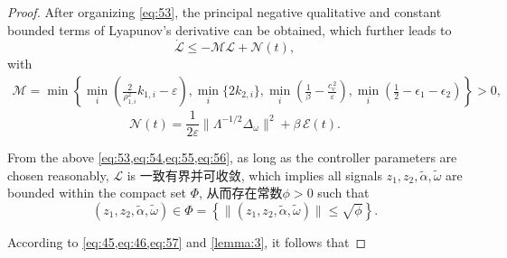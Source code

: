 \documentclass[pdflatex,sn-mathphys-num]{sn-jnl}%
\theoremstyle{thmstyleone}%
\theoremstyle{thmstyletwo}%
\theoremstyle{thmstylethree}%
\begin{document}
\begin{proof}
After organizing \cref{eq:53}, the principal negative qualitative and constant bounded terms of Lyapunov's derivative can be obtained, which further leads to
\begin{equation}\label{eq:54}
\dot{\mathcal{L}}\le -\mathcal{M}  \mathcal{L}+\mathcal{N}(t) ,
		\end{equation}
with
\begin{equation}\label{eq:55}
\begin{aligned}
\mathcal{M}  = \min \left\{
	\min_{i}\left(\frac{2}{\rho_{1,i}^2}k_{1,i}-\varepsilon\right), \min_{i}\{2k_{2,i}\}, \min_{i}\left(\frac{1}{\beta}-\frac{c_v^{\,2}}{\varepsilon}\right),\min_{i}\left(\frac{1}{2}-\epsilon_1-\epsilon_2\right)
\right\}>0,
\end{aligned}
\end{equation}
\begin{equation}\label{eq:56}
	\mathcal{N}(t)  =\frac{1}{2\varepsilon}\big\|\Lambda^{-1/2}\Delta_\omega\big\|^2
+\beta\,\mathcal{E}(t).
\end{equation} 

From the above \cref{eq:53,eq:54,eq:55,eq:56}, as long as the controller parameters are chosen reasonably, $\mathcal{L}$ is 一致有界并可收敛, which implies all signals $z_{1}, z_{2}, {\tilde{\alpha}}, \tilde{\omega}$ are bounded within the compact set $\varPhi $, 从而存在常数$\phi>0$ such that
\begin{equation}\label{eq:57}
	(z_1,z_2,\tilde\alpha,\tilde{\omega}) \in \varPhi =\left\{
	\|(z_1,z_2,\tilde\alpha,\tilde{\omega})\|\le \sqrt{\phi  }\right\}.
\end{equation}
 
According to \cref{eq:45,eq:46,eq:57} and \cref{lemma:3}, it follows that


\end{proof}
\end{document}

